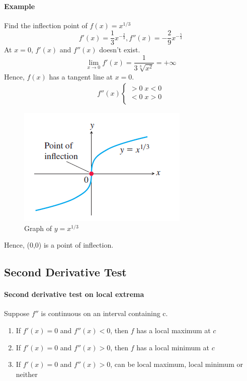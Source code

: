 \documentclass[12pt]{article}
\begin{document}
\paragraph{Example} Find the inflection point of $f(x) = x^{1/3}$
\[
    f'(x) = \frac{1}{3}x^{ - \frac{2}{3}}, f''(x) = - \frac{2}{9} x^{ - \frac{5}{3}}
\]
At $x = 0$, $f'(x)$ and $f''(x)$ doesn't exist.
\[
    \lim_{x \to 0} f'(x) = \frac{1}{3 \sqrt[3]{x^2}} = + \infty
\]
Hence, $f(x)$ has a tangent line at $x = 0$.
\begin{align*} 
     f''(x)
     \begin{cases} 
        > 0 \; x < 0 \\
        < 0 \; x > 0 \\
    \end{cases} 
\end{align*}

\begin{figure}[h!]
     \centering
     \includegraphics[width = 0.5\linewidth]{Images/inflection example.png}
     \caption{Graph of $y = x^{1/3}$}
\end{figure}
Hence, (0,0) is a point of inflection.


\subsection{Second Derivative Test}
\paragraph{Second derivative test on local extrema}
Suppose $f''$ is continuous on an interval containing c. 
\begin{enumerate} 
     \item If $f'(x) = 0$ and $f''(x) < 0$, then $f$ has a local maximum at $c$
     \item If $f'(x) = 0$ and $f''(x) > 0$, then $f$ has a local minimum at $c$
     \item If $f'(x) = 0$ and $f''(x) > 0$, can be local maximum, local minimum or neither
\end{enumerate}
\end{document}
